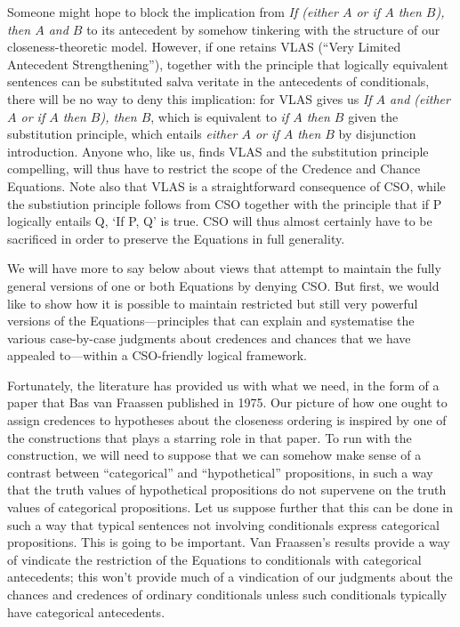 \documentclass[leqno, 11pt, a5paper, openany]{article}
\begin{document}
Someone might hope to block the implication from \emph{If (either $A$ or if $A$ then $B$), then $A$ and $B$} to its antecedent by somehow tinkering with the structure of our closeness-theoretic model. However, if one retains VLAS (“Very Limited Antecedent Strengthening”), together with the principle that logically equivalent sentences can be substituted salva veritate in the antecedents of conditionals, there will be no way to deny this implication: for VLAS gives us \emph{If $A$ and (either $A$ or if $A$ then $B$), then $B$}, which is equivalent to \emph{if $A$ then $B$} given the substitution principle, which entails \emph{either $A$ or if $A$ then $B$} by disjunction introduction. Anyone who, like us, finds VLAS and the substitution principle compelling, will thus have to restrict the scope of the Credence and Chance Equations. Note also that VLAS is a straightforward consequence of CSO, while the substiution principle follows from CSO together with the principle that if P logically entails Q, ‘If P, Q’ is true. CSO will thus almost certainly have to be sacrificed in order to preserve the Equations in full generality.

We will have more to say below about views that attempt to maintain the fully general versions of one or both Equations by denying CSO. But first, we would like to show how it is possible to maintain restricted but still very powerful versions of the Equations---principles that can explain and systematise the various case-by-case judgments about credences and chances that we have appealed to---within a CSO-friendly logical framework.

Fortunately, the literature has provided us with what we need, in the form of a paper that Bas van Fraassen published in 1975. Our picture of how one ought to assign credences to hypotheses about the closeness ordering is inspired by one of the constructions that plays a starring role in that paper. To run with the construction, we will need to suppose that we can somehow make sense of a contrast between “categorical” and “hypothetical” propositions, in such a way that the truth values of hypothetical propositions do not supervene on the truth values of categorical propositions. Let us suppose further that this can be done in such a way that typical sentences not involving conditionals express categorical propositions. This is going to be important. Van Fraassen's results provide a way of vindicate the restriction of the Equations to conditionals with categorical antecedents; this won't provide much of a vindication of our judgments about the chances and credences of ordinary conditionals unless such conditionals typically have categorical antecedents.
\end{document}
